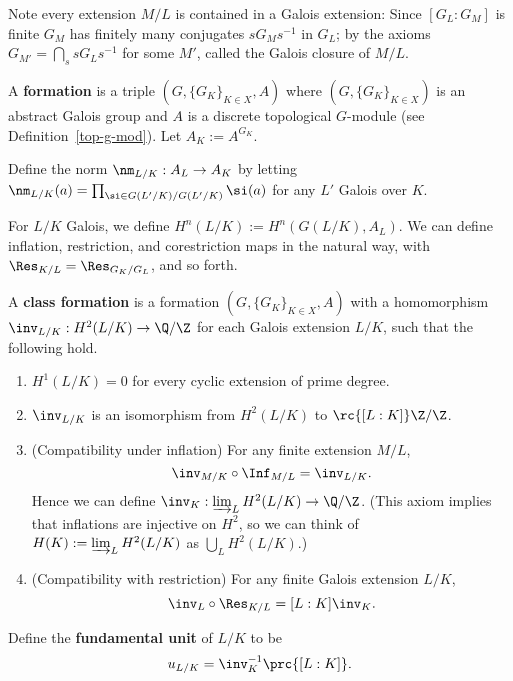 Note every extension $M/L$ is contained in a Galois extension: Since $[G_L:G_M]$ is finite $G_M$ has finitely many conjugates $sG_Ms^{-1}$ in $G_L$; by the axioms $G_{M'}=\bigcap_s sG_Ls^{-1}$ for some $M'$, called the Galois closure of $M/L$.
\begin{df}
A \textbf{formation} is a triple $(G, \{G_K\}_{K\in X}, A)$ where $(G, \{G_K\}_{K\in X})$ is an abstract Galois group and $A$ is a discrete topological $G$-module (see Definition~\ref{top-g-mod}). Let $A_K:=A^{G_K}$.

Define the norm $\nm_{L/K}:A_L\to A_K$ by letting $\nm_{L/K}(a)=\prod_{\si\in G(L'/K)/G(L'/K)} \si(a)$ for any $L'$ Galois over $K$.
\end{df}
For $L/K$ Galois, we define $H^n(L/K):=H^n(G(L/K),A_L)$. We can define inflation, restriction, and corestriction maps in the natural way, with $\Res_{K/L}=\Res_{G_K/G_L}$, and so forth.
\begin{df}
A \textbf{class formation} is a formation $(G, \{G_K\}_{K\in X}, A)$ with a homomorphism $\inv_{L/K}:H^2(L/K)\to \Q/\Z$ for each Galois extension $L/K$, such that the following hold.
\begin{enumerate}
\item
$H^1(L/K)=0$ for every cyclic extension of prime degree.
\item
$\inv_{L/K}$ %
is an isomorphism from $H^2(L/K)$ to $\rc{[L:K]}\Z/\Z$. 
\item (Compatibility under inflation) For any finite extension $M/L$, 
\[\inv_{M/K}\circ \Inf_{M/L}=\inv_{L/K}.\]
Hence we can define $\inv_K:\varinjlim_L H^2(L/K)\to \Q/\Z$. (This axiom implies that inflations are injective on $H^2$, so we can think of  $H(K):=\varinjlim_L H^2(L/K)$ as $\bigcup_L H^2(L/K)$.)
\item (Compatibility with restriction) For any finite Galois extension $L/K$,
\[
\inv_L\circ \Res_{K/L}=[L:K]\inv_K.
\]
\end{enumerate}
Define the \textbf{fundamental unit} of $L/K$ to be
\[
u_{L/K}=\inv_K^{-1}\prc{[L:K]}.
\]
\end{df}

